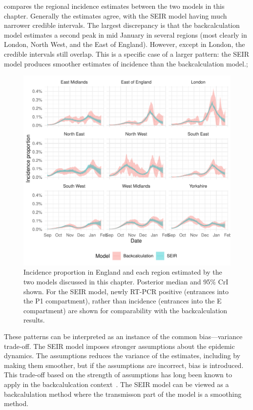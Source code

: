 \documentclass[thesis.tex]{subfiles}
\begin{document}
 compares the regional incidence estimates between the two models in this chapter.
Generally the estimates agree, with the SEIR model having much narrower credible intervals.
The largest discrepancy is that the backcalculation model estimates a second peak in mid January in several regions (most clearly in London, North West, and the East of England).
However, except in London, the credible intervals still overlap.
This is a specific case of a larger pattern: the SEIR model produces smoother estimates of incidence than the backcalculation model.;
\begin{figure}
    \centering \includegraphics{transmission/compare-regions}
    \caption[Comparing each models estimate of regional incidence.]{%
        Incidence proportion in England and each region estimated by the two models discussed in this chapter.
        Posterior median and 95\% CrI shown.
        For the SEIR model, newly RT-PCR positive (entrances into the P1 compartment), rather than incidence (entrances into the E compartment) are shown for comparability with the backcalculation results.
    }
    \label{transmission:fig:compare-regions}
\end{figure}

These patterns can be interpreted as an instance of the common bias---variance trade-off.
The SEIR model imposes stronger assumptions about the epidemic dynamics.
The assumptions reduces the variance of the estimates, including by making them smoother, but if the assumptions are incorrect, bias is introduced.
This trade-off based on the strength of assumptions has long been known to apply in the backcalulcation context~\autocite[e.g.][section 8.3]{brookmeyerBackcalculation}.
The SEIR model can be viewed as a backcalulation method where the transmisson part of the model is a smoothing method.
\end{document}
